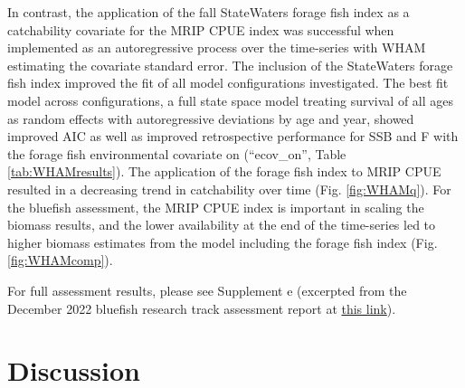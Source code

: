 \documentclass[
]{article}
\begin{document}
In contrast, the application of the fall StateWaters forage fish index as a catchability covariate for the MRIP CPUE index was successful when implemented as an autoregressive process over the time-series with WHAM estimating the covariate standard error. The inclusion of the StateWaters forage fish index improved the fit of all model configurations investigated. The best fit model across configurations, a full state space model treating survival of all ages as random effects with autoregressive deviations by age and year, showed improved AIC as well as improved retrospective performance for SSB and F with the forage fish environmental covariate on (``ecov\_on'', Table \ref{tab:WHAMresults}). The application of the forage fish index to MRIP CPUE resulted in a decreasing trend in catchability over time (Fig. \ref{fig:WHAMq}). For the bluefish assessment, the MRIP CPUE index is important in scaling the biomass results, and the lower availability at the end of the time-series led to higher biomass estimates from the model including the forage fish index (Fig. \ref{fig:WHAMcomp}).

For full assessment results, please see Supplement e (excerpted from the December 2022 bluefish research track assessment report at \href{https://apps-nefsc.fisheries.noaa.gov/saw/sasi_files.php?year=2022\&species_id=32\&stock_id=6\&review_type_id=5\&info_type_id=-1\&map_type_id=\&filename=Bluefish_SAW_SARC_2022_FINAL.pdf}{this link}).

\hypertarget{discussion}{%
\section{Discussion}\label{discussion}}
\end{document}
